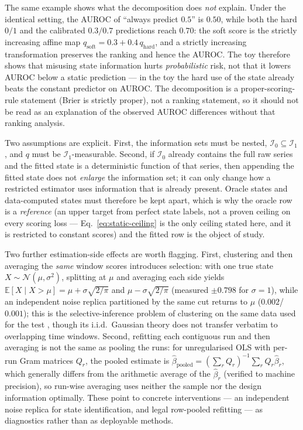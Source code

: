 \documentclass[11pt]{article}
\begin{document}
The same example shows what the decomposition does \emph{not} explain. Under the
identical setting, the AUROC of ``always predict $0.5$'' is $0.50$, while both
the hard $0/1$ and the calibrated $0.3/0.7$ predictions reach $0.70$: the soft
score is the strictly increasing affine map
$q_{\mathrm{soft}}=0.3+0.4\,q_{\mathrm{hard}}$, and a strictly increasing
transformation preserves the ranking and hence the AUROC. The toy therefore
shows that misusing state information hurts \emph{probabilistic} risk, not that
it lowers AUROC below a static prediction --- in the toy the hard use of the
state already beats the constant predictor on AUROC. The decomposition is a
proper-scoring-rule statement (Brier is strictly proper), not a ranking
statement, so it should not be read as an explanation of the observed AUROC
differences without that ranking analysis.

Two assumptions are explicit. First, the information sets must be nested,
$\mathcal I_0\subseteq\mathcal I_1$, and $q$ must be $\mathcal I_1$-measurable.
Second, if $\mathcal I_0$ already contains the full raw series and the fitted
state is a deterministic function of that series, then appending the fitted state
does not \emph{enlarge} the information set; it can only change how a restricted
estimator uses information that is already present. Oracle states and
data-computed states must therefore be kept apart, which is why the oracle row is
a \emph{reference} (an upper target from perfect state labels, not a proven
ceiling on every scoring loss --- Eq.~\eqref{eq:static-ceiling} is the only
ceiling stated here, and it is restricted to constant scores) and the fitted row
is the object of study.

Two further estimation-side effects are worth flagging. First, clustering and
then averaging the \emph{same} window scores introduces selection: with one true
state $X\sim\mathcal N(\mu,\sigma^2)$, splitting at $\mu$ and averaging each side
yields $\mathbb E[X\mid X>\mu]=\mu+\sigma\sqrt{2/\pi}$ and
$\mu-\sigma\sqrt{2/\pi}$ (measured $\pm0.798$ for $\sigma=1$), while an
independent noise replica partitioned by the same cut returns to $\mu$
($0.002$/$0.001$); this is the selective-inference problem of clustering on the
same data used for the test \citep{chen2023selective}, though its i.i.d.\
Gaussian theory does not transfer verbatim to overlapping time windows. Second,
refitting each contiguous run and then averaging is
not the same as pooling the runs: for unregularised OLS with per-run Gram
matrices $Q_r$, the pooled estimate is
$\hat\beta_{\mathrm{pooled}}=(\sum_r Q_r)^{-1}\sum_r Q_r\hat\beta_r$, which
generally differs from the arithmetic average of the $\hat\beta_r$ (verified to
machine precision), so run-wise averaging uses neither the sample nor the design
information optimally. These point to concrete interventions --- an independent
noise replica for state identification, and legal row-pooled refitting --- as
diagnostics rather than as deployable methods.
\end{document}
